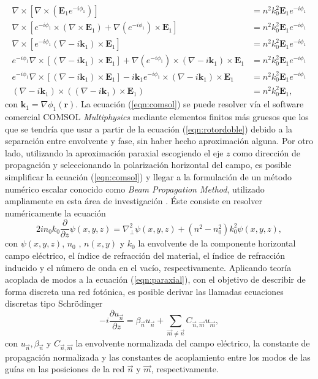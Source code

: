 \begin{align}
\nabla\times[\nabla\times(\textbf{E}_1 e^{-i \phi_1 })] &=  n^2k_0^2 \textbf{E}_1 e^{-i \phi_1}
\\
\nabla\times[ e^{-i \phi_1} \times (\nabla \times \textbf{E}_1) + \nabla(e^{-i \phi_1})\times \textbf{E}_1] &=  n^2k_0^2 \textbf{E}_1 e^{-i \phi_1}
\\
\nabla\times[ e^{-i \phi_1}  (\nabla  - i  \textbf{k} _1)\times\textbf{E}_1  ] &=  n^2k_0^2 \textbf{E}_1 e^{-i \phi_1}
\\
e^{-i \phi_1}  \nabla\times[ (\nabla  - i  \textbf{k} _1)\times\textbf{E}_1] + \nabla(e^{-i \phi_1})\times  (\nabla  - i  \textbf{k} _1)\times\textbf{E}_1  &=  n^2k_0^2 \textbf{E}_1 e^{-i \phi_1}
\\
e^{-i \phi_1}  \nabla\times[ (\nabla  - i  \textbf{k} _1)\times\textbf{E}_1] - i\textbf{k}_1 e^{-i \phi_1}\times  (\nabla  - i  \textbf{k} _1)\times\textbf{E}_1  &=  n^2k_0^2 \textbf{E}_1 e^{-i \phi_1}
\\
	(\nabla-i\textbf{k}_1)\times((\nabla-i\textbf{k}_1)\times \textbf{E}_1) &= n^2k_0^2 \textbf{E}_1,
	 \label{eqn:comsol}
\end{align}
con $\textbf{k}_1 = \nabla\phi_1(\textbf{r})$.
La ecuación (\ref{eqn:comsol}) se puede resolver vía el software comercial COMSOL \textit{Multiphysics} mediante elementos finitos más gruesos que los que se tendría que usar a partir de la ecuación (\ref{eqn:rotordoble}) debido a la separación entre envolvente y fase, sin haber hecho aproximación alguna. Por otro lado, utilizando la aproximación paraxial escogiendo el eje $z$  como dirección de propagación y seleccionando la polarización horizontal del campo, es posible simplificar la ecuación (\ref{eqn:comsol}) y llegar a la formulación de un método numérico escalar conocido como \textit{Beam Propagation Method}, utilizado ampliamente en esta área de investigación \cite{bics, interorbital, OAMCaging, vortex, bpm}. Éste consiste en resolver numéricamente la ecuación
\begin{equation}
	2in_0k_0\frac{\partial}{\partial z}\psi(x,y,z) = \nabla_\perp^2 \psi (x,y,z) + \left(n^2-n_0^2\right)k_0^2 \psi (x,y,z), \label{eqn:paraxial}
\end{equation}
con $\psi(x,y,z)$, $n_0$ , $n(x,y)$ y $k_0$ la envolvente de la componente horizontal campo eléctrico, el índice de refracción del material, el índice de refracción inducido y el número de onda en el vacío, respectivamente. Aplicando teoría acoplada de modos \cite{coupledmodetheory} a la ecuación (\ref{eqn:paraxial}), con el objetivo de describir de forma discreta una red fotónica, es posible derivar las llamadas ecuaciones discretas tipo Schrödinger \cite{discretesolitons, artificialFB, FBdynamics}
\begin{equation}
	-i\frac{\partial u_{\vec{n}} }{\partial z} = \beta_{\vec{n}}u_{\vec{n}} + \sum_{\vec{m}\neq\vec{n}} C_{\vec{n},\vec{m}}u_{\vec{m}}, \label{eqn:CMT}
\end{equation}
con $u_{\vec{n}}, \beta_{\vec{n}}$ y $C_{\vec{n}, \vec{m}}$ la envolvente normalizada del campo eléctrico, la constante de propagación normalizada y las constantes de acoplamiento entre los modos de las guías en las posiciones de la red $\vec{n}$ y $\vec{m}$, respectivamente.